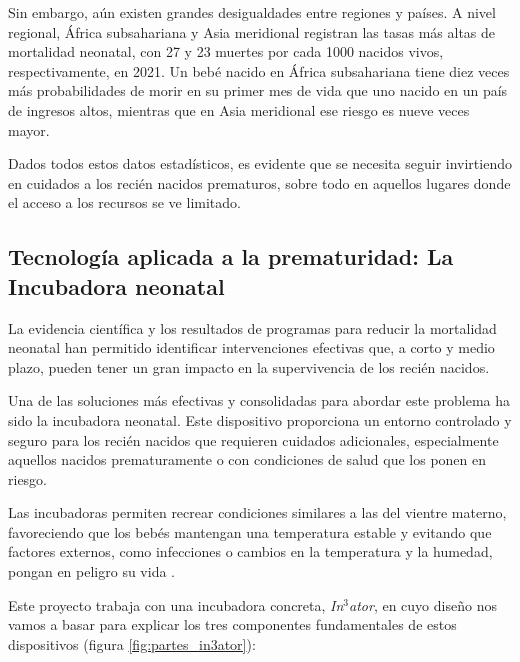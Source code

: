 Sin embargo, aún existen grandes desigualdades entre regiones y países. A nivel regional, África subsahariana y Asia meridional registran las tasas más altas de mortalidad neonatal, con 27 y 23 muertes por cada 1000 nacidos vivos, respectivamente, en 2021. Un bebé nacido en África subsahariana tiene diez veces más probabilidades de morir en su primer mes de vida que uno nacido en un país de ingresos altos, mientras que en Asia meridional ese riesgo es nueve veces mayor.


Dados todos estos datos estadísticos, es evidente que se necesita seguir invirtiendo en cuidados a los recién nacidos prematuros, sobre todo en aquellos lugares donde el acceso a los recursos se ve limitado.

\subsection{Tecnología aplicada a la prematuridad: La Incubadora neonatal}

La evidencia científica y los resultados de programas para reducir la mortalidad neonatal han permitido identificar intervenciones efectivas que, a corto y medio plazo, pueden tener un gran impacto en la supervivencia de los recién nacidos. 

Una de las soluciones más efectivas y consolidadas para abordar este problema ha sido la incubadora neonatal. Este dispositivo proporciona un entorno controlado y seguro para los recién nacidos que requieren cuidados adicionales, especialmente aquellos nacidos prematuramente o con condiciones de salud que los ponen en riesgo. 

Las incubadoras permiten recrear condiciones similares a las del vientre materno, favoreciendo que los bebés mantengan una temperatura estable y evitando que factores externos, como infecciones o cambios en la temperatura y la humedad, pongan en peligro su vida \cite{minsa2008prevencion}.

Este proyecto trabaja con una incubadora concreta,\textit{ In$^3$ator}, en cuyo diseño nos vamos a basar para explicar los tres componentes fundamentales de estos dispositivos (figura \ref{fig:partes_in3ator}):

